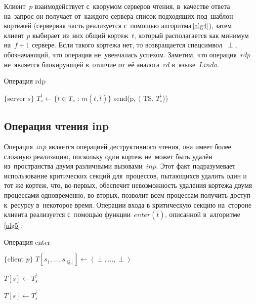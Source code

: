 Клиент~$p$ взаимодействует с~кворумом серверов чтения, в~качестве ответа на~запрос он получает от~каждого сервера список подходящих под~шаблон кортежей (серверная часть реализуется с~помощью алгоритма\,\ref{alg4}), затем клиент $p$ выбирает из~них общий кортеж~$t$, который располагается как минимум на~$f + 1$ сервере. Если такого кортежа нет, то возвращается спецсимвол~$\perp$, обозначающий, что операция не~увенчалась успехом. Заметим, что операция~$rdp$ не~является блокирующей в~отличие от~её аналога~$rd$ в~языке~$Linda$.

\begin{algorithm}[H]
	\caption{Операция rdp}\label{alg4}
	\begin{algorithmic}[1]
		\Statex $\{$server $s \}$
		\State $T_s^{\bar t} \gets \{t \in T_s$ : $m(t, \bar t)\}$
		\State send(p, $\langle$ TS, $T_s^{\bar t}\rangle$)
		\EndUpon
	\end{algorithmic}
\end{algorithm}

\subsection{Операция чтения inp}\label{subsec5:3}
Операция~$inp$ является операцией деструктивного чтения, она имеет более сложную реализацию, поскольку один кортеж не~может быть удалён из~пространства двумя различными вызовами~$inp$. Этот факт подразумевает использование критических секций для~процессов, пытающихся удалить один и тот же кортеж, что, во-первых, обеспечит невозможность удаления кортежа двумя процессами одновременно, во-вторых, позволит всем процессам получить доступ к~ресурсу в~некоторое время. Операции входа в критическую секцию на~стороне клиента реализуется с~помощью функции~$enter(\bar t)$, описанной в~алгоритме\,\ref{alg5}:

\begin{algorithm}[H]
	\caption{Операция enter}\label{alg5}
	\begin{algorithmic}[1]
		\Statex $\{$client $p \}$
		\State $T[s_1, \dots, s_{|Q_r|}] \gets (\perp, \dots, \perp)$
		
		\State {}
		\State $T[s] \gets T_s^{\bar t}$
		\EndFor
		
		\State {}
		\State $T[s] \gets T_s^{\bar t}$
		\EndFor
		
		\State {}
		\EndIf
		\State \Return{$\perp$}
		\EndFunction
	\end{algorithmic}
\end{algorithm}

